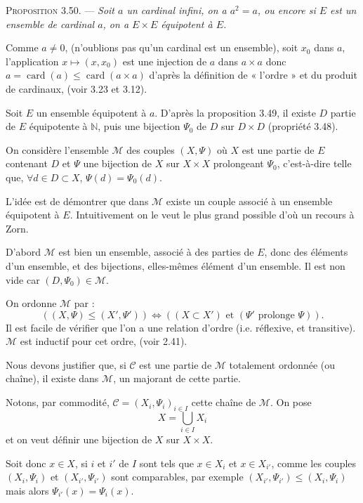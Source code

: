 \medskip\noindent\textsc{Proposition 3.50.} --- \emph{Soit $a$ un cardinal infini, on a $a^2=a$, ou encore si $E$ est un ensemble de cardinal $a$, on a $E\times E$ équipotent à $E$.}

Comme $a\ne0$, (n'oublions pas qu'un cardinal est un ensemble), soit $x_0$ dans $a$, l'application $x\mapsto(x,x_0)$ est une injection de $a$ dans $a\times a$ donc $a=\operatorname{card}(a)\le\operatorname{card}(a\times a)$ d'après la définition de « l'ordre » et du produit de cardinaux, (voir 3.23 et 3.12).

Soit $E$ un ensemble équipotent à $a$. D'après la proposition 3.49, il existe $D$ partie de $E$ équipotente à $\mathbb N$, puis une bijection $\Psi_0$ de $D$ sur $D\times D$ (propriété 3.48).

On considère l'ensemble $\mathcal M$ des couples $(X,\Psi)$ où $X$ est une partie de $E$ contenant $D$ et $\Psi$ une bijection de $X$ sur $X\times X$ prolongeant $\Psi_0$, c'est-à-dire telle que, $\forall d\in D\subset X$, $\Psi(d)=\Psi_0(d)$.

L'idée est de démontrer que dans $\mathcal M$ existe un couple associé à un ensemble équipotent à $E$. Intuitivement on le veut le plus grand possible d'où un recours à Zorn.

D'abord $\mathcal M$ est bien un ensemble, associé à des parties de $E$, donc des éléments d'un ensemble, et des bijections, elles-mêmes élément d'un ensemble. Il est non vide car $(D,\Psi_0)\in\mathcal M$.

On ordonne $\mathcal M$ par :
\[
((X,\Psi)\le(X',\Psi'))\Leftrightarrow((X\subset X')\text{ et }(\Psi'\text{ prolonge }\Psi)).
\]
Il est facile de vérifier que l'on a une relation d'ordre (i.e. réflexive,  et transitive). $\mathcal M$ est inductif pour cet ordre, (voir 2.41).

Nous devons justifier que, si $\mathcal C$ est une partie de $\mathcal M$ totalement ordonnée (ou chaîne), il existe dans $\mathcal M$, un majorant de cette partie.

Notons, par commodité, $\mathcal C=(X_i,\Psi_i)_{i\in I}$ cette chaîne de $\mathcal M$. On pose
\[
X=\bigcup_{i\in I}X_i
\]
et on veut définir une bijection de $X$ sur $X\times X$.

Soit donc $x\in X$, si $i$ et $i'$ de $I$ sont tels que $x\in X_i$ et $x\in X_{i'}$, comme les couples $(X_i,\Psi_i)$ et $(X_{i'},\Psi_{i'})$ sont comparables, par exemple $(X_{i'},\Psi_{i'})\le(X_i,\Psi_i)$ mais alors $\Psi_{i'}(x)=\Psi_i(x)$.

